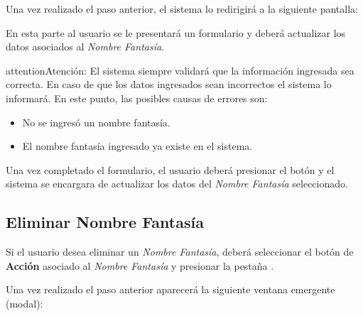 \documentclass[a4paper,10pt,spanish]{sphinxmanual}
\begin{document}

Una vez realizado el paso anterior, el sistema lo redirigirá a la siguiente pantalla:


En esta parte al usuario se le presentará un formulario y deberá actualizar los datos asociados al \emph{Nombre Fantasía}.

\begin{notice}{attention}{Atención:}
El sistema siempre validará que la información ingresada sea correcta. En caso de que los datos ingresados sean incorrectos el sistema lo informará.
En este punto, las posibles causas de errores son:
\begin{itemize}
\item {} 
No se ingresó un nombre fantasía.

\item {} 
El nombre fantasía ingresado ya existe en el sistema.

\end{itemize}
\end{notice}

Una vez completado el formulario, el usuario deberá presionar el botón  y el sistema se encargara de actualizar los datos del \emph{Nombre Fantasía} seleccionado.


\subsection{Eliminar Nombre Fantasía}
\label{nombresfantasia:eliminar-nombre-fantasia}\label{nombresfantasia:id3}
Si el usuario desea eliminar un \emph{Nombre Fantasía}, deberá seleccionar el botón de \textbf{Acción} asociado al \emph{Nombre Fantasía} y presionar la pestaña .


Una vez realizado el paso anterior aparecerá la siguiente ventana emergente (modal):

\end{document}
